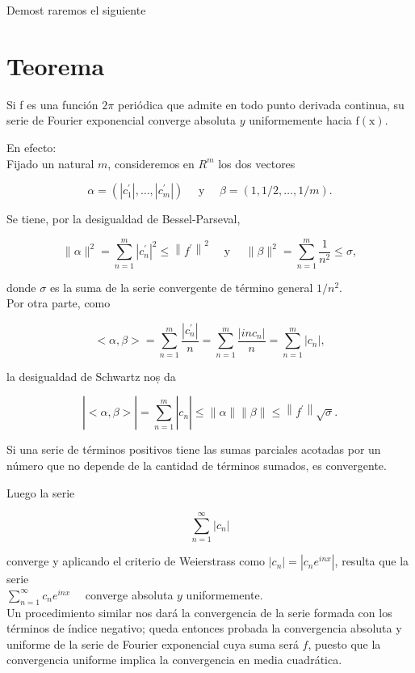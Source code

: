 \documentclass[10pt]{article}
\theoremstyle{plain}
\theoremstyle{definition}
\theoremstyle{remark}
\begin{document}
Demost raremos el siguiente

\section*{Teorema}
Si f es una función $2 \pi$ periódica que admite en todo punto derivada continua, su serie de Fourier exponencial converge absoluta $y$ uniformemente hacia $\mathrm{f}(\mathrm{x})$.

En efecto:\\
Fijado un natural $m$, consideremos en $R^{m}$ los dos vectores

$$
\alpha=\left(\left|c_{1}^{\prime}\right|, \ldots,\left|c_{m}^{\prime}\right|\right) \quad \text { y } \quad \beta=(1,1 / 2, \ldots, 1 / m) .
$$

Se tiene, por la desigualdad de Bessel-Parseval,

$$
\|\alpha\|^{2}=\sum_{n=1}^{m}\left|c_{n}^{\prime}\right|^{2} \leqslant\left\|f^{\prime}\right\|^{2} \quad \text { y } \quad\|\beta\|^{2}=\sum_{n=1}^{m} \frac{1}{n^{2}} \leqslant \sigma,
$$

donde $\sigma$ es la suma de la serie convergente de término general $1 / n^{2}$.\\
Por otra parte, como

$$
<\alpha, \beta>=\sum_{n=1}^{m} \frac{\left|c_{n}^{\prime}\right|}{n}=\sum_{n=1}^{m} \frac{\left|i n c_{n}\right|}{n}=\sum_{n=1}^{m}\left|c_{n}\right|,
$$

la desigualdad de Schwartz noș da

$$
\left|<\alpha, \beta>\left|=\sum_{n=1}^{m}\right| c_{n}\right| \leqslant\|\alpha\|\|\beta\| \leqslant\left\|f^{\prime}\right\| \sqrt{\sigma} .
$$

Si una serie de términos positivos tiene las sumas parciales acotadas por un número que no depende de la cantidad de términos sumados, es convergente.

Luego la serie

$$
\sum_{n=1}^{\infty}\left|c_{n}\right|
$$

converge y aplicando el criterio de Weierstrass como $\left|c_{n}\right|=\left|c_{n} e^{i n x}\right|$, resulta que la serie\\
$\sum_{n=1}^{\infty} c_{n} e^{i n x} \quad$ converge absoluta $y$ uniformemente.\\
Un procedimiento similar nos dará la convergencia de la serie formada con los términos de índice negativo; queda entonces probada la convergencia absoluta y uniforme de la serie de Fourier exponencial cuya suma será $f$, puesto que la convergencia uniforme implica la convergencia en media cuadrática.
\end{document}
